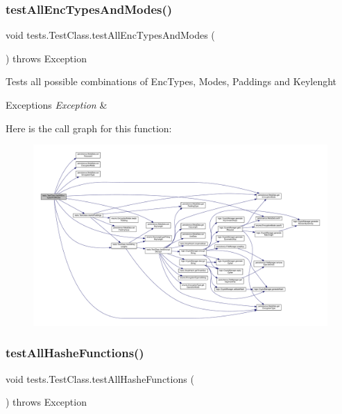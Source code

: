 \subsubsection{\texorpdfstring{test\+All\+Enc\+Types\+And\+Modes()}{testAllEncTypesAndModes()}}
{\footnotesize\ttfamily void tests.\+Test\+Class.\+test\+All\+Enc\+Types\+And\+Modes (\begin{DoxyParamCaption}{ }\end{DoxyParamCaption}) throws Exception}

Tests all possible combinations of Enc\+Types, Modes, Paddings and Keylenght 
\begin{DoxyExceptions}{Exceptions}
{\em Exception} & \\
\hline
\end{DoxyExceptions}
Here is the call graph for this function\+:
\nopagebreak
\begin{figure}[H]
\begin{center}
\leavevmode
\includegraphics[width=350pt]{classtests_1_1_test_class_a85be535c071d279d8d7bc1a40201dcff_cgraph}
\end{center}
\end{figure}
\mbox{\label{classtests_1_1_test_class_a4f4c0d8502a8a3b322a44e20a5f9cdce}} 
\subsubsection{\texorpdfstring{test\+All\+Hashe\+Functions()}{testAllHasheFunctions()}}
{\footnotesize\ttfamily void tests.\+Test\+Class.\+test\+All\+Hashe\+Functions (\begin{DoxyParamCaption}{ }\end{DoxyParamCaption}) throws Exception}

